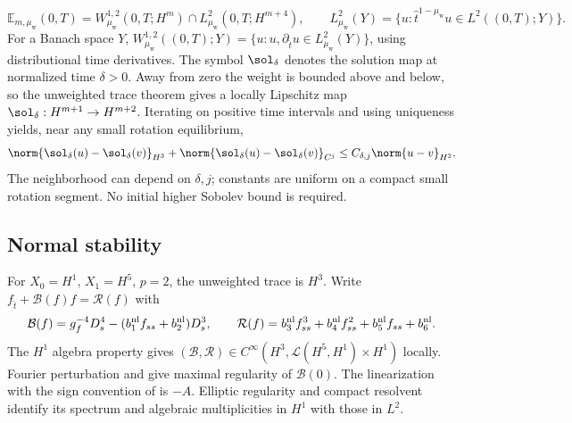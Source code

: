 \begin{equation}\label{eq:MR-spaces}
 \mathbb E_{m,\mu_{\mathrm w}}(0,T)=W^{1,2}_{\mu_{\mathrm w}}(0,T;H^m)\cap L^2_{\mu_{\mathrm w}}(0,T;H^{m+4}),
 \qquad L^2_{\mu_{\mathrm w}}(Y)=\{u:\widehat t^{1-\mu_{\mathrm w}}u\in L^2((0,T);Y)\}.
\end{equation}
For a Banach space $Y$, $W^{1,2}_{\mu_{\mathrm w}}((0,T);Y)=\{u:u,\partial_{\widehat t}u\in L^2_{\mu_{\mathrm w}}(Y)\}$, using distributional time derivatives. The symbol $\sol_\delta$ denotes the solution map at normalized time $\delta>0$. Away from zero the weight is bounded above and below, so the unweighted trace theorem gives a locally Lipschitz map $\sol_\delta:H^{m+1}\to H^{m+2}$. Iterating on positive time intervals and using uniqueness yields, near any small rotation equilibrium,
\begin{equation}\label{eq:smoothing}
 \norm{\sol_\delta(u)-\sol_\delta(v)}_{H^3}
 +\norm{\sol_\delta(u)-\sol_\delta(v)}_{C^j}
 \le C_{\delta,j}\norm{u-v}_{H^2}.
\end{equation}
The neighborhood can depend on $\delta,j$; constants are uniform on a compact small rotation segment. No initial higher Sobolev bound is required.

\subsection{Normal stability}
For $X_0=H^1$, $X_1=H^5$, $p=2$, the unweighted trace is $H^3$. Write $f_{\widehat t}+\mathcal B(f)f=\mathcal R(f)$ with
\[
 \mathcal B(f)=g_f^{-4}D_s^4-(b_1^{\rm nl}f_{ss}+b_2^{\rm nl})D_s^3,\qquad
 \mathcal R(f)=b_3^{\rm nl}f_{ss}^3+b_4^{\rm nl}f_{ss}^2+b_5^{\rm nl}f_{ss}+b_6^{\rm nl}.
\]
The $H^1$ algebra property gives $(\mathcal B,\mathcal R)\in C^\infty(H^3,\mathcal L(H^5,H^1)\times H^1)$ locally. Fourier perturbation and \cite{deSimon} give maximal regularity of $\mathcal B(0)$. The linearization with the sign convention of \cite{PSZ} is $-A$. Elliptic regularity and compact resolvent identify its spectrum and algebraic multiplicities in $H^1$ with those in $L^2$.


